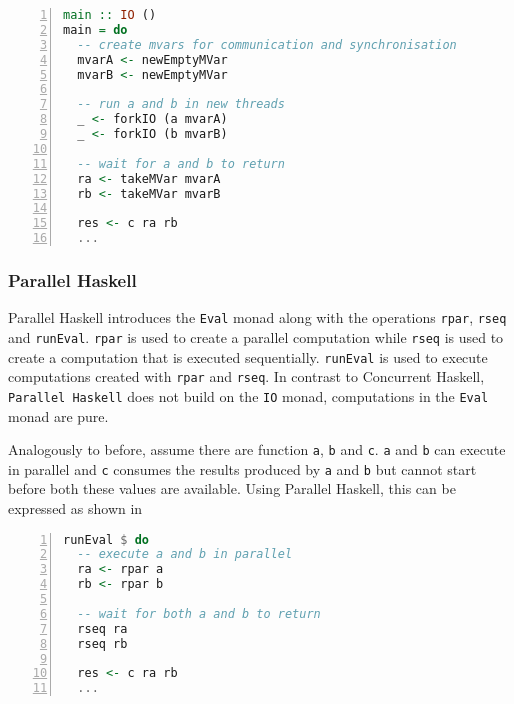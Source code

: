 \begin{lstlisting}[language=Haskell, numbers=left, frame=bt, label=lst:example_concurrent_haskell, caption={Parallel and sequential composition in \textsf{Concurrent Haskell}.}]
main :: IO ()
main = do
  -- create mvars for communication and synchronisation
  mvarA <- newEmptyMVar
  mvarB <- newEmptyMVar  
  
  -- run a and b in new threads
  _ <- forkIO (a mvarA)
  _ <- forkIO (b mvarB)  
  
  -- wait for a and b to return
  ra <- takeMVar mvarA
  rb <- takeMVar mvarB
  
  res <- c ra rb
  ...
\end{lstlisting}

\subsubsection{Parallel Haskell}
\textsf{Parallel Haskell} introduces the \texttt{Eval} monad along with the operations \texttt{rpar}, \texttt{rseq} and \texttt{runEval}. \texttt{rpar} is used to create a parallel computation while \texttt{rseq} is used to create a computation that is executed sequentially. \texttt{runEval} is used to execute computations created with \texttt{rpar} and \texttt{rseq}. In contrast to \textsf{Concurrent Haskell}, \texttt{Parallel Haskell} does not build on the \texttt{IO} monad, computations in the \texttt{Eval} monad are pure.

Analogously to before, assume there are function \texttt{a}, \texttt{b} and \texttt{c}. \texttt{a} and \texttt{b} can execute in parallel and \texttt{c} consumes the results produced by \texttt{a} and \texttt{b} but cannot start before both these values are available. Using \textsf{Parallel Haskell}, this can be expressed as shown in 
\begin{lstlisting}[language=Haskell, numbers=left, frame=bt, label=lst:example_parallel_haskell, caption={Parallel and sequential composition in \textsf{Parallel Haskell}.}]
runEval $ do
  -- execute a and b in parallel
  ra <- rpar a
  rb <- rpar b
  
  -- wait for both a and b to return
  rseq ra
  rseq rb
  
  res <- c ra rb
  ...
\end{lstlisting}